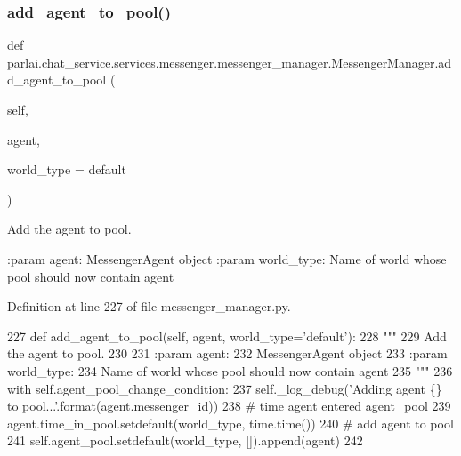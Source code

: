 \subsubsection{\texorpdfstring{add\+\_\+agent\+\_\+to\+\_\+pool()}{add\_agent\_to\_pool()}}
{\footnotesize\ttfamily def parlai.\+chat\+\_\+service.\+services.\+messenger.\+messenger\+\_\+manager.\+Messenger\+Manager.\+add\+\_\+agent\+\_\+to\+\_\+pool (\begin{DoxyParamCaption}\item[{}]{self,  }\item[{}]{agent,  }\item[{}]{world\+\_\+type = {\ttfamily \textquotesingle{}default\textquotesingle{}} }\end{DoxyParamCaption})}

\begin{DoxyVerb}Add the agent to pool.

:param agent:
    MessengerAgent object
:param world_type:
    Name of world whose pool should now contain agent
\end{DoxyVerb}
 

Definition at line 227 of file messenger\+\_\+manager.\+py.


\begin{DoxyCode}
227     \textcolor{keyword}{def }add\_agent\_to\_pool(self, agent, world\_type='default'):
228         \textcolor{stringliteral}{"""}
229 \textcolor{stringliteral}{        Add the agent to pool.}
230 \textcolor{stringliteral}{}
231 \textcolor{stringliteral}{        :param agent:}
232 \textcolor{stringliteral}{            MessengerAgent object}
233 \textcolor{stringliteral}{        :param world\_type:}
234 \textcolor{stringliteral}{            Name of world whose pool should now contain agent}
235 \textcolor{stringliteral}{        """}
236         with self.agent\_pool\_change\_condition:
237             self.\_log\_debug(\textcolor{stringliteral}{'Adding agent \{\} to pool...'}.\hyperlink{namespaceparlai_1_1chat__service_1_1services_1_1messenger_1_1shared__utils_a32e2e2022b824fbaf80c747160b52a76}{format}(agent.messenger\_id))
238             \textcolor{comment}{# time agent entered agent\_pool}
239             agent.time\_in\_pool.setdefault(world\_type, time.time())
240             \textcolor{comment}{# add agent to pool}
241             self.agent\_pool.setdefault(world\_type, []).append(agent)
242 
\end{DoxyCode}
\mbox{\label{classparlai_1_1chat__service_1_1services_1_1messenger_1_1messenger__manager_1_1MessengerManager_ade5e639c76e2c48815c079d515ecaf9b}} 
